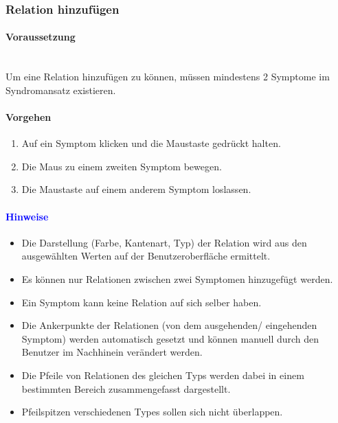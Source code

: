 \documentclass[enabledeprecatedfontcommands,fontsize=11pt,paper=a4,twoside]{scrartcl}
\newcounter{one}
\newcommand*{\hint}{\paragraph{\textcolor{blue}{Hinweise}}}
\newcommand*{\condition}{\paragraph{Voraussetzung}$\;$ \vspace{0.2cm}\\}
\newcommand*{\action}{\paragraph{Vorgehen}}
\begin{document}
		\subsubsection{Relation hinzufügen}
		\condition
		Um eine Relation hinzufügen zu können, müssen mindestens 2 Symptome im Syndromansatz existieren. 
		\action
		\begin{enumerate}
			\item Auf ein Symptom klicken und die Maustaste gedrückt halten.
			\item Die Maus zu einem zweiten Symptom bewegen. 
			\item Die Maustaste auf einem anderem Symptom loslassen. 
		\end{enumerate}
		\hint
		\begin{itemize}
			\item Die Darstellung (Farbe, Kantenart, Typ) der Relation wird aus den ausgewählten Werten auf der Benutzeroberfläche ermittelt. 
			\item Es können nur Relationen zwischen zwei Symptomen hinzugefügt werden. 
			\item Ein Symptom kann keine Relation auf sich selber haben.
			\item Die Ankerpunkte der Relationen (von dem ausgehenden/ eingehenden Symptom) werden automatisch gesetzt und können manuell durch den Benutzer im Nachhinein verändert werden. 
			\item Die Pfeile von Relationen des gleichen Typs werden dabei in einem bestimmten Bereich zusammengefasst dargestellt. 
			\item Pfeilspitzen verschiedenen Types sollen sich nicht überlappen.
		\end{itemize}
		
		\begin{figure}[ht!]
			\centering
		\end{figure}
		
		\newpage
\end{document}
